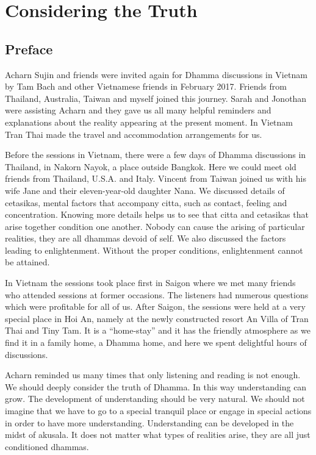 \part{Considering the Truth}
\chapter{Preface}

Acharn Sujin and friends were invited again for Dhamma discussions in
Vietnam by Tam Bach and other Vietnamese friends in February 2017.
Friends from Thailand, Australia, Taiwan and myself joined this journey.
Sarah and Jonothan were assisting Acharn and they gave us all many
helpful reminders and explanations about the reality appearing at the
present moment. In Vietnam Tran Thai made the travel and accommodation
arrangements for us.

Before the sessions in Vietnam, there were a few days of Dhamma
discussions in Thailand, in Nakorn Nayok, a place outside Bangkok. Here
we could meet old friends from Thailand, U.S.A. and Italy. Vincent from
Taiwan joined us with his wife Jane and their eleven-year-old daughter
Nana. We discussed details of cetasikas, mental factors that accompany
citta, such as contact, feeling and concentration. Knowing more details
helps us to see that citta and cetasikas that arise together condition
one another. Nobody can cause the arising of particular realities, they
are all dhammas devoid of self. We also discussed the factors leading to
enlightenment. Without the proper conditions, enlightenment cannot be
attained.

In Vietnam the sessions took place first in Saigon where we met many
friends who attended sessions at former occasions. The listeners had
numerous questions which were profitable for all of us. After Saigon,
the sessions were held at a very special place in Hoi An, namely at the
newly constructed resort An Villa of Tran Thai and Tiny Tam. It is a
``home-stay'' and it has the friendly atmosphere as we find it in a
family home, a Dhamma home, and here we spent delightful hours of
discussions.

Acharn reminded us many times that only listening and reading is not
enough. We should deeply consider the truth of Dhamma. In this way
understanding can grow. The development of understanding should be very
natural. We should not imagine that we have to go to a special tranquil
place or engage in special actions in order to have more understanding.
Understanding can be developed in the midst of akusala. It does not
matter what types of realities arise, they are all just conditioned
dhammas.




